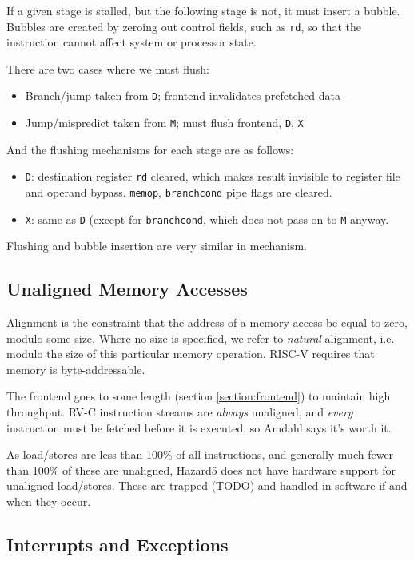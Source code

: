 \documentclass[notitlepage]{article}
\begin{document}
If a given stage is stalled, but the following stage is not, it must insert a bubble. Bubbles are created by zeroing out control fields, such as \texttt{rd}, so that the instruction cannot affect system or processor state.

There are two cases where we must flush:

\begin{itemize}
	\item Branch/jump taken from \texttt{D}; frontend invalidates prefetched data
	\item Jump/mispredict taken from \texttt{M}; must flush frontend, \texttt{D}, \texttt{X}
\end{itemize}

And the flushing mechanisms for each stage are as follows:
\begin{itemize}
	\item \texttt{D}: destination register \texttt{rd} cleared, which makes result invisible to register file and operand bypass. \texttt{memop}, \texttt{branchcond} pipe flags are cleared.
	\item \texttt{X}: same as \texttt{D} (except for \texttt{branchcond}, which does not pass on to \texttt{M} anyway.
\end{itemize}

Flushing and bubble insertion are very similar in mechanism.

\subsection{Unaligned Memory Accesses}

Alignment is the constraint that the address of a memory access be equal to zero, modulo some size. Where no size is specified, we refer to \textit{natural} alignment, i.e. modulo the size of this particular memory operation. RISC-V requires that memory is byte-addressable.

The frontend goes to some length (section \ref{section:frontend}) to maintain high throughput. RV-C instruction streams are \textit{always} unaligned, and \textit{every} instruction must be fetched before it is executed, so Amdahl says it's worth it.

As load/stores are less than 100\% of all instructions, and generally much fewer than 100\% of these are unaligned, Hazard5 does not have hardware support for unaligned load/stores. These are trapped (TODO) and handled in software if and when they occur.

\subsection{Interrupts and Exceptions}
\end{document}
